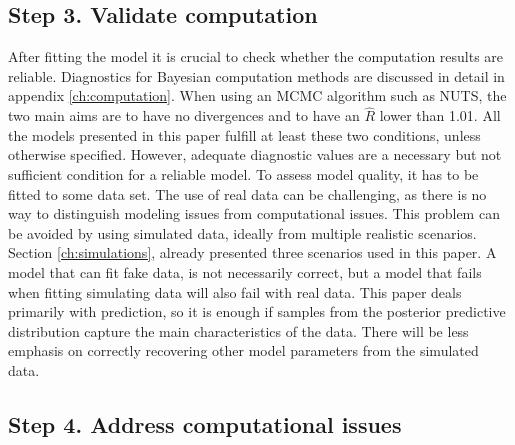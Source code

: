 \subsection{Step 3. Validate computation}

After fitting the model it is crucial to check whether the computation results are reliable.
Diagnostics for Bayesian computation methods are discussed in detail in appendix \ref{ch:computation}.
When using an MCMC algorithm such as NUTS, the two main aims are to have no divergences and to have an $\hat R$ lower than 1.01.
All the models presented in this paper fulfill at least these two conditions, unless otherwise specified.
However, adequate diagnostic values are a necessary but not sufficient condition for a reliable model.
To assess model quality, it has to be fitted to some data set.
The use of real data can be challenging, as there is no way to distinguish modeling issues from computational issues.
This problem can be avoided by using simulated data, ideally from multiple realistic scenarios.
Section \ref{ch:simulations}, already presented three scenarios used in this paper.
A model that can fit fake data, is not necessarily correct, but a model that fails when fitting simulating data will also fail with real data.
This paper deals primarily with prediction, so it is enough if samples from the posterior predictive distribution capture the main characteristics of the data.
There will be less emphasis on correctly recovering other model parameters from the simulated data.


\subsection{Step 4. Address computational issues}


